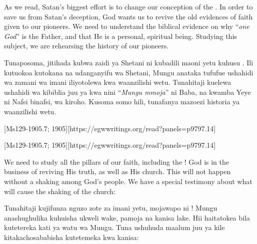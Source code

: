 As we read, Satan’s biggest effort is to change our conception of the . In order to save us from Satan’s deception, God wants us to revive the old evidences of faith given to our pioneers. We need to understand the biblical evidence on why “\textit{one God}” is the Father, and that He is a personal, spiritual being. Studying this subject, we are rehearsing the history of our pioneers.


Tunaposoma, jitihada kubwa zaidi ya Shetani ni kubadili maoni yetu kuhusu . Ili kutuokoa kutokana na udanganyifu wa Shetani, Mungu anataka tufufue ushahidi wa zamani wa imani iliyotolewa kwa waanzilishi wetu. Tunahitaji kuelewa ushahidi wa kibiblia juu ya kwa nini “\textit{Mungu mmoja}” ni Baba, na kwamba Yeye ni Nafsi binafsi, wa kiroho. Kusoma somo hili, tunafanya mazoezi historia ya waanzilishi wetu.


[Ms129-1905.7; 1905][https://egwwritings.org/read?panels=p9797.14]


[Ms129-1905.7; 1905][https://egwwritings.org/read?panels=p9797.14]


We need to study all the pillars of our faith, including the ! God is in the business of reviving His truth, as well as His church. This will not happen without a shaking among God’s people. We have a special testimony about what will cause the shaking of the church:


Tunahitaji kujifunza nguzo zote za imani yetu, mojawapo ni ! Mungu anashughulika kuhuisha ukweli wake, pamoja na kanisa lake. Hii haitatokea bila kutetereka kati ya watu wa Mungu. Tuna ushuhuda maalum juu ya kile kitakachosababisha kutetemeka kwa kanisa:



